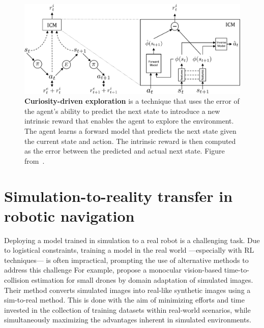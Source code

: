 \begin{figure}
    \centering
    \includegraphics[width=\textwidth]{figures/related_work/curiosity}
    \caption{\textbf{Curiosity-driven exploration} is a technique that uses the error of the agent's ability to predict the next state to introduce a new intrinsic reward that enables the agent to explore the environment.
    The agent learns a forward model that predicts the next state given the current state and action.
    The intrinsic reward is then computed as the error between the predicted and actual next state.
    Figure from~\cite{pathak2017}.}
    \label{fig:curiosity}
\end{figure}

\section{Simulation-to-reality transfer in robotic navigation}\label{sec:simulation-to-reality-transfer-in-robotic-navigation}
Deploying a model trained in simulation to a real robot is a challenging task.
Due to logistical constraints, training a model in the real world —especially with RL techniques— is often impractical, prompting the use of alternative methods to address this challenge
For example, \cite{kim2022} propose a monocular vision-based time-to-collision estimation for small drones by domain adaptation of simulated images.
Their method converts simulated images into real-like synthetic images using a sim-to-real method.
This is done with the aim of minimizing efforts and time invested in the collection of training datasets within real-world scenarios, while simultaneously maximizing the advantages inherent in simulated environments.

